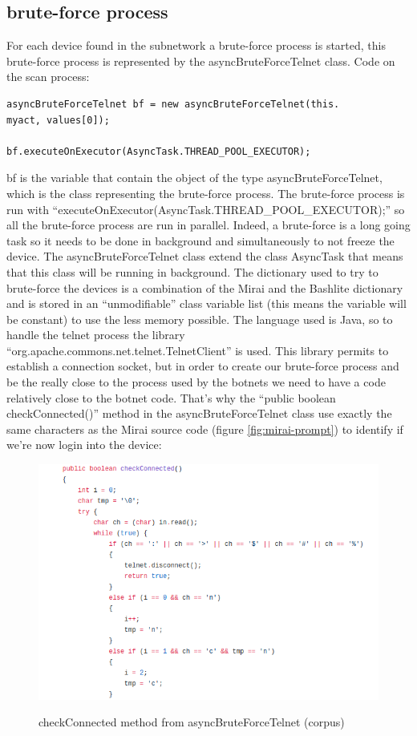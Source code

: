 \documentclass{report}
\begin{document}
\subsection{brute-force process}
For each device found in the subnetwork a brute-force process is started, this brute-force process is represented by the asyncBruteForceTelnet class.\newline
Code on the scan process:
\lstset{language=Java}
\begin{lstlisting}[frame=single]
asyncBruteForceTelnet bf = new asyncBruteForceTelnet(this.
myact, values[0]);

bf.executeOnExecutor(AsyncTask.THREAD_POOL_EXECUTOR);
\end{lstlisting}
bf is the variable that contain the object of the type asyncBruteForceTelnet, which is the class representing the brute-force process. The brute-force process is run with ``executeOnExecutor(AsyncTask.THREAD\_POOL\_EXECUTOR);'' so all the brute-force process are run in parallel. Indeed, a brute-force is a long going task so it needs to be done in background and simultaneously to not freeze the device.\newline
The asyncBruteForceTelnet class extend the class AsyncTask that means that this class will be running in background. The dictionary used to try to brute-force the devices is a combination of the Mirai and the Bashlite dictionary and is stored in an ``unmodifiable'' class variable list (this means the variable will be constant) to use the less memory possible.\newline
The language used is Java, so to handle the telnet process the library ``org.apache.commons.net.telnet.TelnetClient'' is used. This library permits to establish a connection socket, but in order to create our brute-force process and be the really close to the process used by the botnets we need to have a code relatively close to the botnet code. That's why the ``public boolean checkConnected()'' method in the asyncBruteForceTelnet class use exactly the same characters as the Mirai source code (figure \ref{fig:mirai-prompt}) to identify if we're now login into the device:
\begin{figure}[h]
 \caption{checkConnected method from asyncBruteForceTelnet (corpus)}
 \centering
 \includegraphics[width=1\textwidth]{./img/checkconnected-apk}
 \label{fig:checkconnected}
\end{figure}
\end{document}
